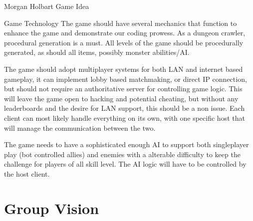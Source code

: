 \documentclass[12pt]{report}
\begin{document}
\begin{section}{Morgan Holbart Game Idea}
\begin{subsection}{Game Technology}
The game should have several mechanics that function to enhance the game and demonstrate our coding prowess. As
a dungeon crawler, procedural generation is a must. All levels of the game should be procedurally generated, as
should all items, possibly monster abilities/AI.

The game should adopt multiplayer systems for both LAN and internet based gameplay, it can implement lobby based
matchmaking, or direct IP connection, but should not require an authoritative server for controlling game logic. 
This will leave the game open to hacking and potential cheating, but without any leaderboards and the desire for
LAN support, this should be a non issue. Each client can most likely handle everything on its own, with one specific
host that will manage the communication between the two.

The game needs to have a sophisticated enough AI to support both singleplayer play (bot controlled allies) and enemies
with a alterable difficulty to keep the challenge for players of all skill level. The AI logic will have to be 
controlled by the host client.
\end{subsection}
\end{section}

\chapter{Group Vision}

\end{document}
